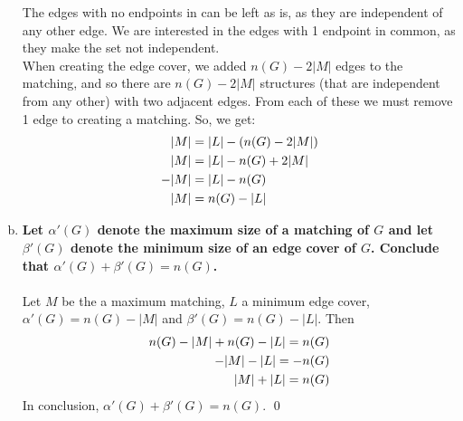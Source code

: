 \begin{enumerate}[a)]
    \linebreak 
    The edges with no endpoints in can be left as is, as they are independent of any other edge. We are interested in the edges with 1 endpoint in common, as they make the set not independent. \\
    \linebreak 
    When creating the edge cover, we added $n(G) - 2|M|$ edges to the matching, and so there are $n(G) - 2|M|$ structures (that are independent from any other) with two adjacent edges. From each of these we must remove 1 edge to creating a matching. So, we get: 
    \begin{align}
    \notag
        |M| &= |L| - (n(G) - 2|M|) \\
    \notag
        |M| &= |L| - n(G) + 2|M| \\
    \notag
        -|M| &= |L| - n(G) \\
    \notag
        |M| &= n(G) - |L|
    \end{align}
    \boldmath
    \item \textbf{Let $\alpha ' (G)$ denote the maximum size of a matching of $G$ and let $\beta ' (G)$ denote the minimum size of an edge cover of $G$. Conclude that $\alpha ' (G) + \beta ' (G) = n(G)$.} \\
    \unboldmath \\
    Let $M$ be the a maximum matching, $L$ a minimum edge cover, $\alpha '(G) = n(G) - |M|$ and $\beta'(G) = n(G) - |L|$. Then 
    \begin{align}
    \notag
        n(G) - |M| + n(G) - |L| = n(G)& \\
        \notag
        -|M| -|L| = -n(G)& \\
        \notag
        |M| + |L| = n(G)& 
    \end{align}
In conclusion, $\alpha'(G) + \beta'(G) = n(G)$. \qed 
\end{enumerate}

